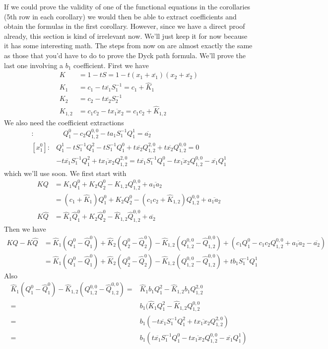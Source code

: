 \documentclass[12pt]{article}
\theoremstyle{definition} \newtheorem{definition}[theorem]{Definition}
\newcommand{\ol}[1]{\overline{#1}}
\newcommand{\wh}{\widehat}
\begin{document}
If we could prove the validity of one of the functional equations in the corollaries (5th row in each corollary) we would then be able to extract coefficients and obtain the formulas in the first corollary. However, since we have a direct proof already, this section is kind of irrelevant now. We'll just keep it for now because it has some interesting math. The steps from now on are almost exactly the same as those that you'd have to do to prove the Dyck path formula. We'll prove the last one involving a $b_1$ coefficient. First we have
\begin{align*}
   K &= 1 - tS = 1 - t(x_1+\ol{x_1})(x_2+\ol{x_2})\\
   K_1 &= c_1 - t \ol{x_1} S_1^{-1} = c_1 + \wh{K}_1\\
   K_2 &= c_2 - t \ol{x_2} S_2^{-1}\\
   K_{1,2} &= c_1c_2 - t\ol{x_1x_2} = c_1c_2+\wh{K}_{1,2}
\end{align*}
We also need the coefficient extractions
\begin{align*}[x_1^0]:&\quad Q_1^0 - c_2Q_{1,2}^{0,0}-ta_1S_1^{-1}Q_1^1 =\ol{a_2}\\
[x_1^0]: &Q_1^1-tS_1^{-1}Q_1^2-tS_1^{-1}Q_1^0+ t \ol{x_2}Q_{1,2}^{2,0}+t\ol{x_2}Q_{1,2}^{0,0} = 0\\
                &-t\ol{x_1}S_1^{-1}Q_1^2+t\ol{x_1x_2}Q_{1,2}^{2,0} = t\ol{x_1}S_1^{-1}Q_1^0-t\ol{x_1x_2}Q_{1,2}^{0,0}-\ol{x_1}Q_1^1
\end{align*}
which we'll use soon. We first start with
\begin{align*}
KQ &= K_1Q_1^0 + K_2 Q_2^0-K_{1,2}Q_{1,2}^{0,0} + \ol{a_1a_2}\\ 
      &= (c_1+\wh{K}_1)Q_1^0 + K_2 Q_2^0-(c_1c_2+\wh{K}_{1,2})Q_{1,2}^{0,0} + \ol{a_1a_2}\\
K\wh{Q} &=\wh{K}_1\wh{Q}_1^0 + K_2 \wh{Q}_2^0-\wh{K}_{1,2}\wh{Q}_{1,2}^{0,0} + \ol{a_2}
\end{align*}
Then we have
\begin{align*}
KQ-K\wh{Q} &= \wh{K}_1(Q_1^0-\wh{Q}_1^0)+\wh{K}_2(Q_2^0-\wh{Q}_2^0)-\wh{K}_{1,2}(Q_{1,2}^{0,0}-\wh{Q}_{1,2}^{0,0})+(c_1Q_1^0-c_1c_2Q_{1,2}^{0,0}+\ol{a_1a_2}-\ol{a_2})\\
                     &=\wh{K}_1(Q_1^0-\wh{Q}_1^0)+\wh{K}_2(Q_2^0-\wh{Q}_2^0)-\wh{K}_{1,2}(Q_{1,2}^{0,0}-\wh{Q}_{1,2}^{0,0}) + tb_1S_1^{-1}Q_1^1
\end{align*}
Also
\begin{align*}
 \wh{K}_1(Q_1^0-\wh{Q}_1^0) -\wh{K}_{1,2}(Q_{1,2}^{0,0}-\wh{Q}_{1,2}^{0,0})=&\wh{K}_1b_1Q_1^2-\wh{K}_{1,2}b_1Q_{1,2}^{2,0}\\
=&b_1(\wh{K}_1Q_1^2-\wh{K}_{1,2}Q_{1,2}^{0,0}\\
=&b_1(-t\ol{x_1}S_1^{-1}Q_1^2+t\ol{x_1x_2}Q_{1,2}^{2,0}) \\
=&b_1(t\ol{x_1}S_1^{-1}Q_1^0-t\ol{x_1x_2}Q_{1,2}^{0,0}-\ol{x_1}Q_1^1)
\end{align*}
\end{document}
